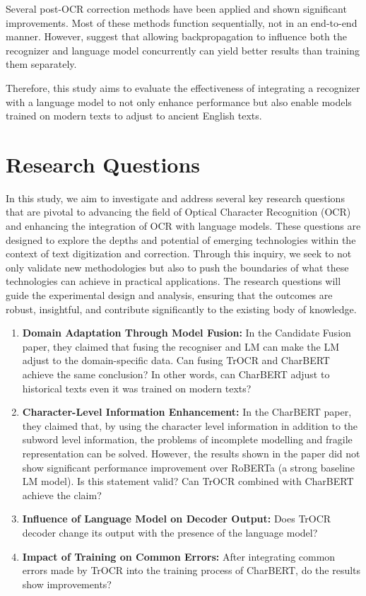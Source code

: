 Several post-OCR correction methods have been applied and shown significant improvements. Most of these methods function sequentially, not in an end-to-end manner. However, \cite{kang2021candidate} suggest that allowing backpropagation to influence both the recognizer and language model concurrently can yield better results than training them separately. 

Therefore, this study aims to evaluate the effectiveness of integrating a recognizer with a language model to not only enhance performance but also enable models trained on modern texts to adjust to ancient English texts.
\section{Research Questions}
\label{sec:1_research_questions}
In this study, we aim to investigate and address several key research questions that are pivotal to advancing the field of Optical Character Recognition (OCR) and enhancing the integration of OCR with language models. These questions are designed to explore the depths and potential of emerging technologies within the context of text digitization and correction. Through this inquiry, we seek to not only validate new methodologies but also to push the boundaries of what these technologies can achieve in practical applications. The research questions will guide the experimental design and analysis, ensuring that the outcomes are robust, insightful, and contribute significantly to the existing body of knowledge.
\begin{enumerate}
    \item \textbf{Domain Adaptation Through Model Fusion: }In the Candidate Fusion paper, they claimed that fusing the recogniser and LM can make the LM adjust to the domain-specific data. Can fusing TrOCR and CharBERT achieve the same conclusion? In other words, can CharBERT adjust to historical texts even it was trained on modern texts?
    \item \textbf{Character-Level Information Enhancement: }In the CharBERT paper, they claimed that, by using the character level information in addition to the subword level information, the problems of incomplete modelling and fragile 
    representation can be solved. However, the results shown in the paper did not show significant performance improvement over RoBERTa (a strong baseline LM model). Is this statement valid? Can TrOCR combined with CharBERT achieve the claim?
    \item \textbf{Influence of Language Model on Decoder Output: }Does TrOCR decoder change its output with the presence of the language model?
    \item \textbf{Impact of Training on Common Errors:} After integrating common errors made by TrOCR into the training process of CharBERT, do the results show improvements? 
\end{enumerate}


